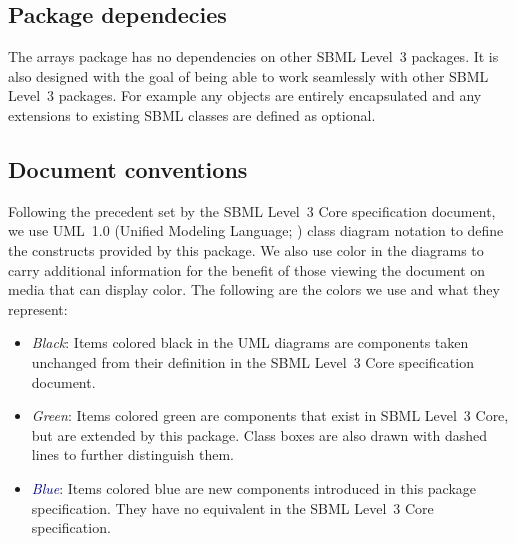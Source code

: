 
\subsection{Package dependecies}

The arrays package has no dependencies on other SBML Level~3 packages.  It is also designed with the goal of being able to work seamlessly with other SBML Level~3 packages. For example any objects are entirely encapsulated and any extensions to existing SBML classes are defined as optional.

\subsection{Document conventions}
\label{conventions}

Following the precedent set by the SBML Level~3 Core specification
document, we use UML~1.0 (Unified Modeling Language;
\citealt{eriksson:1998,oestereich:1999}) class diagram notation to
define the constructs provided by this package.  We also use color in
the diagrams to carry additional information for the benefit of those
viewing the document on media that can display color.  The following are
the colors we use and what they represent:

\begin{itemize}

\item[\raisebox{2.75pt}{\colorbox{black}{\rule{0.8pt}{0.8pt}}}]
  \emph{Black}: Items colored black in the UML diagrams are components
  taken unchanged from their definition in the SBML Level~3 Core
  specification document.

\item[\raisebox{2.75pt}{\colorbox{mediumgreen}{\rule{0.8pt}{0.8pt}}}]
  \emph{\textcolor{mediumgreen}{Green}}: Items colored green are
  components that exist in SBML Level~3 Core, but are extended by this
  package.  Class boxes are also drawn with dashed lines to further
  distinguish them.

\item[\raisebox{2.75pt}{\colorbox{darkblue}{\rule{0.8pt}{0.8pt}}}]
  \emph{\textcolor{darkblue}{Blue}}: Items colored blue are new
  components introduced in this package specification.  They have no
  equivalent in the SBML Level~3 Core specification.

\end{itemize}

